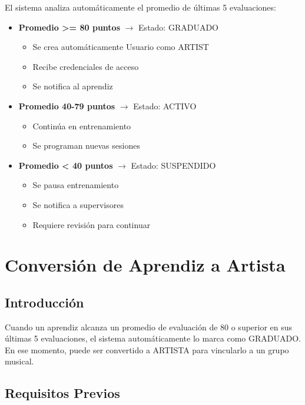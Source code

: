 \documentclass[12pt,a4paper,spanish,oneside]{report}
\begin{document}
El sistema analiza automáticamente el promedio de últimas 5 evaluaciones:

\begin{itemize}
    \item \textbf{Promedio >= 80 puntos} $\rightarrow$ Estado: GRADUADO
    \begin{itemize}
        \item Se crea automáticamente Usuario como ARTIST
        \item Recibe credenciales de acceso
        \item Se notifica al aprendiz
    \end{itemize}
    
    \item \textbf{Promedio 40-79 puntos} $\rightarrow$ Estado: ACTIVO
    \begin{itemize}
        \item Continúa en entrenamiento
        \item Se programan nuevas sesiones
    \end{itemize}
    
    \item \textbf{Promedio < 40 puntos} $\rightarrow$ Estado: SUSPENDIDO
    \begin{itemize}
        \item Se pausa entrenamiento
        \item Se notifica a supervisores
        \item Requiere revisión para continuar
    \end{itemize}
\end{itemize}

\chapter{Conversión de Aprendiz a Artista}

\section{Introducción}

Cuando un aprendiz alcanza un promedio de evaluación de 80 o superior en sus últimas 5 evaluaciones, el sistema automáticamente lo marca como GRADUADO. En ese momento, puede ser convertido a ARTISTA para vincularlo a un grupo musical.

\section{Requisitos Previos}
\end{document}
